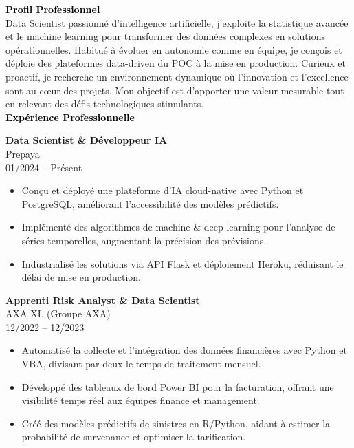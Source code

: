 \documentclass{article}
\begin{document}
\begin{paracol}{2}
\textcolor{black}{\Large \textbf{Profil Professionnel}} \\[2pt]
Data Scientist passionné d’intelligence artificielle, j’exploite la statistique avancée et le machine learning pour transformer des données complexes en solutions opérationnelles. Habitué à évoluer en autonomie comme en équipe, je conçois et déploie des plateformes data-driven du POC à la mise en production. Curieux et proactif, je recherche un environnement dynamique où l’innovation et l’excellence sont au cœur des projets. Mon objectif est d’apporter une valeur mesurable tout en relevant des défis technologiques stimulants. \\[8pt]

\textcolor{black}{\Large \textbf{Expérience Professionnelle}} \\[2pt]

\colorbox{maincolor}{%
  \begin{minipage}{\linewidth}
    \textbf{Data Scientist \& Développeur IA} \\ Prepaya \\ 01/2024 – Présent
    \begin{itemize}
      \item Conçu et déployé une plateforme d’IA cloud-native avec Python et PostgreSQL, améliorant l’accessibilité des modèles prédictifs. \item Implémenté des algorithmes de machine \& deep learning pour l’analyse de séries temporelles, augmentant la précision des prévisions. \item Industrialisé les solutions via API Flask et déploiement Heroku, réduisant le délai de mise en production.
    \end{itemize}
  \end{minipage}}

\vspace{3mm}


\colorbox{maincolor}{%
  \begin{minipage}{\linewidth}
    \textbf{Apprenti Risk Analyst \& Data Scientist} \\ AXA XL (Groupe AXA) \\ 12/2022 – 12/2023
    \begin{itemize}
      \item Automatisé la collecte et l’intégration des données financières avec Python et VBA, divisant par deux le temps de traitement mensuel. \item Développé des tableaux de bord Power BI pour la facturation, offrant une visibilité temps réel aux équipes finance et management. \item Créé des modèles prédictifs de sinistres en R/Python, aidant à estimer la probabilité de survenance et optimiser la tarification.
    \end{itemize}
  \end{minipage}}


\end{paracol}
\end{document}
